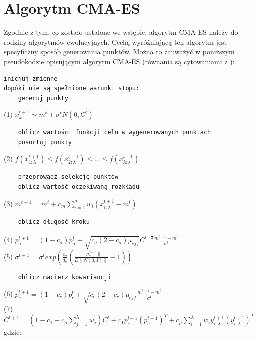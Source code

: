\documentclass{mini}
\begin{document}
\section{Algorytm CMA-ES} \label{secalgcmaes}
\hspace{3,4ex}Zgodnie z tym, co zostało ustalone we wstępie, algorytm CMA-ES należy do rodziny algorytmów ewolucyjnych. Cechą wyróżniającą ten algorytm jest specyficzny sposób generowania punktów. Można to zauważyć w poniższym pseudokodzie opisującym algorytm CMA-ES (równania są cytowaniami z \cite{cmaes_tutorial}):
\begin{Verbatim}
inicjuj zmienne
dopóki nie są spełnione warunki stopu:
	generuj punkty
\end{Verbatim}
(1)\hspace{12ex} $x_k^{t+1} \sim m^t + \sigma^tN(0,C^t)$
\begin{Verbatim}
	oblicz wartości funkcji celu w wygenerowanych punktach
	posortuj punkty
\end{Verbatim}
(2)\hspace{12ex} $f(x_{1:\lambda}^{t+1}) \leq f(x_{2:\lambda}^{t+1}) \leq ... \leq f(x_{\lambda:\lambda}^{t+1})$
\begin{Verbatim}
	przeprowadź selekcję punktów
	oblicz wartość oczekiwaną rozkładu
\end{Verbatim}
(3)\hspace{12ex} $m^{t+1}=m^t+c_m\sum\limits_{i=1}^\mu w_i(x_{i:\lambda}^{t+1}-m^t)$
\begin{Verbatim}
	oblicz długość kroku
\end{Verbatim}
(4)\hspace{12ex} $p_\sigma^{t+1}=(1-c_\sigma)p_\sigma^t+\sqrt{c_\sigma(2-c_\sigma)\mu_{eff}}{C^t}^{-\frac{1}{2}}\frac{m^{t+1}-m^t}{\sigma^t}$ \\
(5)\hspace{12ex} $\sigma^{t+1}=\sigma^t exp (\frac{c_\sigma}{d_\sigma}(\frac{\|p_\sigma^{t+1}\|}{E\|N(0,I)\|}-1))$
\begin{Verbatim}
	oblicz macierz kowariancji
\end{Verbatim}
(6)\hspace{12ex} $p_c^{t+1} = (1-c_c)p_c^t+\sqrt{c_c(2-c_c)\mu_{eff}}\frac{m^{t+1}-m^t}{\sigma^t}$ \\
(7)\hspace{12ex} $C^{t+1} = (1-c_1-c_\mu\sum\limits_{j=1}^\lambda w_j)C^t+c_1p_c^{t+1}{(p_c^{t+1})}^T+c_\mu \sum\limits_{i=1}^\lambda w_iy_{i:\lambda}^{t+1}{(y_{i:\lambda}^{t+1})}^T$
\newline
gdzie:
\end{document}
